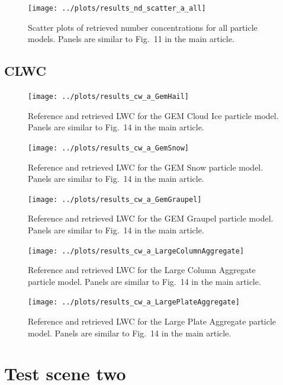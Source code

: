 \documentclass[journal abbreviation, manuscript]{copernicus}
\begin{document}
\clearpage
\begin{figure}[!hbpt]
\centering
\texttt{[image: ../plots/results\_nd\_scatter\_a\_all]}
\caption{Scatter plots of retrieved number concentrations for all particle models. Panels
are similar to Fig.~11 in the main article.}
\end{figure}
\clearpage

\subsection{CLWC}

\clearpage
\begin{figure}[!hbpt]
\centering
\texttt{[image: ../plots/results\_cw\_a\_GemHail]}
\caption{Reference and retrieved LWC for the GEM Cloud Ice particle model. Panels
are similar to Fig.~14 in the main article.}
\end{figure}

\clearpage
\begin{figure}[!hbpt]
\centering
\texttt{[image: ../plots/results\_cw\_a\_GemSnow]}
\caption{Reference and retrieved LWC for the GEM Snow particle model. Panels
are similar to Fig.~14 in the main article.}
\end{figure}

\clearpage
\begin{figure}[!hbpt]
\centering
\texttt{[image: ../plots/results\_cw\_a\_GemGraupel]}
\caption{Reference and retrieved LWC for the GEM Graupel particle model. Panels
are similar to Fig.~14 in the main article.}
\end{figure}

\clearpage
\begin{figure}[!hbpt]
\centering
\texttt{[image: ../plots/results\_cw\_a\_LargeColumnAggregate]}
\caption{Reference and retrieved LWC for the Large Column Aggregate particle model. Panels
are similar to Fig.~14 in the main article.}
\end{figure}

\clearpage
\begin{figure}[!hbpt]
\centering
\texttt{[image: ../plots/results\_cw\_a\_LargePlateAggregate]}
\caption{Reference and retrieved LWC for the Large Plate Aggregate particle model. Panels
are similar to Fig.~14 in the main article.}
\end{figure}

\section{Test scene two}
\end{document}
